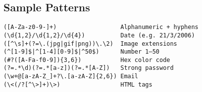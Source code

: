 \documentclass[10pt]{article}
\begin{document}
\begin{multicols}{2}
\section*{\textcolor{red2}{Sample Patterns}}
\begin{lstlisting}[frame=single, rulecolor=\color{red2!70}, backgroundcolor=\color{red2!20}]
([A-Za-z0-9-]+)                  Alphanumeric + hyphens
(\d{1,2}/\d{1,2}/\d{4})          Date (e.g. 21/3/2006)
([^\s]+(?=\.(jpg|gif|png))\.\2)  Image extensions
(^[1-9]$|^[1-4][0-9]$|^50$)      Number 1–50
(#?([A-Fa-f0-9]){3,6})           Hex color code
(?=.*\d)(?=.*[a-z])(?=.*[A-Z])   Strong password
(\w+@[a-zA-Z_]+?\.[a-zA-Z]{2,6}) Email
(\<(/?[^\>]+)\>)                 HTML tags
\end{lstlisting}

\end{multicols}
\end{document}
